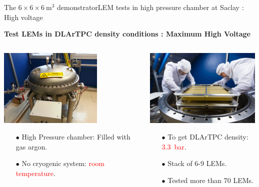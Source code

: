 \documentclass[10pt]{beamer}
\begin{document}
    \begin{frame}{The \texorpdfstring{$6 \times 6 \times \SI{6}{\meter\cubed}$}{666} demonstrator}{LEM tests in high pressure chamber at Saclay : High voltage}
    	\begin{scriptsize}
    		\begin{center}\textbf{Test LEMs in DLArTPC density conditions : Maximum High Voltage}\end{center}
    		\begin{columns}
		    	\begin{column}{0.5\textwidth}
		    		\includegraphics[height=3.7cm]{figures/666/gamelle.jpg}\\
		    		\begin{itemize}
		    			\item[$\bullet$] High Pressure chamber: Filled with gas argon.
		    			\item[$\bullet$] No cryogenic system: \textcolor{red}{room temperature}.
		    		\end{itemize}
		    	\end{column}\hfill
		    	\begin{column}{0.5\textwidth}
		    		\includegraphics[height=3.7cm]{figures/666/6lems_gamelle.jpg}\\
		    		\begin{itemize}
		    			\item[$\bullet$] To get DLArTPC density: \textcolor{red}{\SI{3.3}{\bar}}.
		    			\item[$\bullet$] Stack of 6-9 LEMs.
		    			\item[$\bullet$] Tested more than 70 LEMs.
		    		\end{itemize}
		    	\end{column}
		    \end{columns}
	    \end{scriptsize} 
    \end{frame}
    
\end{document}
